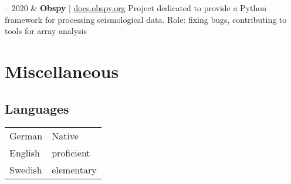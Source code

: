\documentclass[10pt, a4paper]{article}
\newcommand{\TablePad}{\vspace{-0.4cm}}
\newcommand{\Website}[1]{\href{https://#1}{#1}}
\newcommand{\Duration}[2]{\fontsize{9pt}{0}\selectfont #1 -- #2}
\begin{document}
\begin{EntriesTable}
  \Duration{2019}{2020} &
  \textbf{Obspy} | \Website{docs.obspy.org}
  \newline
  Project dedicated to provide a Python framework for processing seismological data.
  \newline
  Role: fixing bugs, contributing to tools for array analysis
  \\
\end{EntriesTable}


\section{Miscellaneous}


\subsection{Languages}

\TablePad
\begin{tabularx}{\textwidth}{@{}p{} p{}@{}}
  German & Native
  \\
  English & proficient
  \\
  Swedish & elementary
\end{tabularx}


\end{document}
